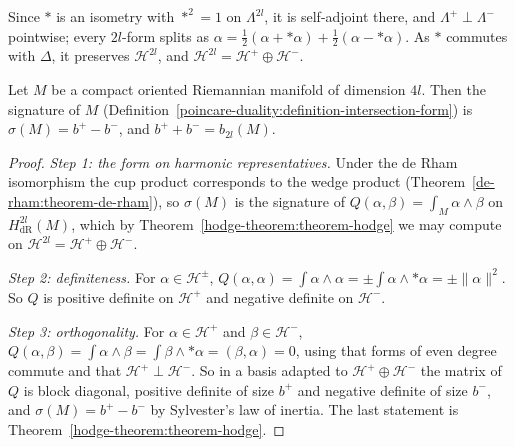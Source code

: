 Since $*$ is an isometry with $*^2 = 1$ on $\Lambda^{2l}$, it is self-adjoint there, and $\Lambda^+ \perp \Lambda^-$ pointwise; every $2l$-form splits as $\alpha = \frac12(\alpha + *\alpha) + \frac12(\alpha - *\alpha)$.
As $*$ commutes with $\Delta$, it preserves $\mathcal{H}^{2l}$, and $\mathcal{H}^{2l} = \mathcal{H}^+ \oplus \mathcal{H}^-$.

\begin{theorem}\label{hodge-theorem:theorem-signature-harmonic}
Let $M$ be a compact oriented Riemannian manifold of dimension $4l$. Then the signature of $M$ (Definition~\ref{poincare-duality:definition-intersection-form}) is $\sigma(M) = b^+ - b^-$, and $b^+ + b^- = b_{2l}(M)$.
\end{theorem}

\begin{proof}
\emph{Step 1: the form on harmonic representatives.} Under the de Rham isomorphism the cup product corresponds to the wedge product (Theorem~\ref{de-rham:theorem-de-rham}), so
$\sigma(M)$ is the signature of $Q(\alpha, \beta) = \int_M\alpha \wedge \beta$ on $H^{2l}_{\mathrm{dR}}(M)$, which by Theorem~\ref{hodge-theorem:theorem-hodge} we may compute on $\mathcal{H}^{2l} = \mathcal{H}^+ \oplus \mathcal{H}^-$.

\emph{Step 2: definiteness.} For $\alpha \in \mathcal{H}^\pm$, $Q(\alpha, \alpha) = \int\alpha \wedge \alpha = \pm\int\alpha \wedge *\alpha = \pm\|\alpha\|^2$. So $Q$ is positive definite on $\mathcal{H}^+$ and negative definite on $\mathcal{H}^-$.

\emph{Step 3: orthogonality.} For $\alpha \in \mathcal{H}^+$ and $\beta \in \mathcal{H}^-$, $Q(\alpha, \beta) = \int\alpha \wedge \beta = \int\beta \wedge *\alpha = (\beta, \alpha) = 0$, using that forms of even degree commute and that
$\mathcal{H}^+ \perp \mathcal{H}^-$. So in a basis adapted to $\mathcal{H}^+ \oplus \mathcal{H}^-$ the matrix of $Q$ is block diagonal, positive definite of size $b^+$ and negative definite of size $b^-$, and
$\sigma(M) = b^+ - b^-$ by Sylvester's law of inertia. The last statement is Theorem~\ref{hodge-theorem:theorem-hodge}.
\end{proof}

